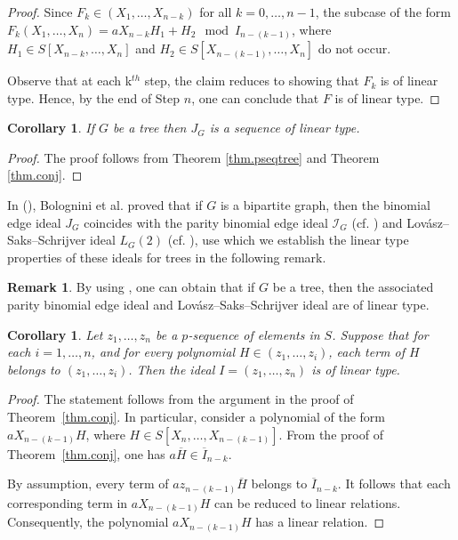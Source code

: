 \documentclass[11pt,a4paper,reqno]{amsart}
\newtheorem{corollary}[theorem]{Corollary}
\theoremstyle{definition}
\newtheorem{remark}[theorem]{Remark}
\begin{document}
\begin{proof}
    \vspace{2mm}

    Since \(F_k \in (X_1,\ldots,X_{n-k})\) for all \(k=0,\ldots,n-1\), the subcase of the form $F_{k}(X_1,\ldots, X_n) = aX_{n-k}H_1 + H_2 \mod I_{n-(k-1)}$, where $H_1 \in S[X_{n-k},\ldots, X_n]$ and $H_2 \in S[X_{n-(k-1)},\ldots, X_n]$ do not occur.
    

    Observe that at each k$^{th}$ step, the claim  reduces to showing that $F_{k}$ is of linear type. Hence, by the end of Step $n$, one can conclude that $F$ is of linear type. 
\end{proof}






\begin{corollary}
     If $G$ be a tree then $J_G$ is a sequence of linear type.
\end{corollary}
\begin{proof}
    The proof follows from Theorem \ref{thm.pseqtree} and Theorem \ref{thm.conj}.
\end{proof}

In (\cite[Corollary 6.2]{B2018}), Bolognini et al. proved that if $G$ is a bipartite graph, then the binomial edge ideal $J_G$ coincides with the parity binomial edge ideal $\mathcal{I}_G$ (cf. \cite{TCT}) and Lovász–Saks–Schrijver ideal $L_G(2)$ (cf. \cite{HMSW}), use which we establish the linear type properties of these ideals for trees in the following remark.

\begin{remark}
    By using \cite[Corollary 6.2]{B2018}, one can obtain that if $G$ be a tree, then the associated parity binomial edge ideal and Lovász–Saks–Schrijver ideal are of linear type. 
\end{remark}



\begin{corollary}
Let \(z_1,\ldots,z_n\) be a \(p\)-sequence of elements in \(S\). Suppose that for each \(i=1,\ldots,n\), and for every polynomial \(H \in (z_1,\ldots,z_i)\), each term of \(H\) belongs to \((z_1,\ldots,z_i)\). Then the ideal \(I=(z_1,\ldots,z_n)\) is of linear type.
\end{corollary}
\begin{proof}
The statement follows from the argument in the proof of Theorem~\ref{thm.conj}. In particular, consider a polynomial of the form \(aX_{n-(k-1)}H\), where \(H \in S[X_n,\ldots,X_{n-(k-1)}]\). From the proof of Theorem~\ref{thm.conj}, one has $a\overline{H} \in \overline{I}_{n-k}$.

By assumption, every term of \(az_{n-(k-1)}\overline{H}\) belongs to \(\overline{I}_{n-k}\). It follows that each corresponding term in \(aX_{n-(k-1)}H\) can be reduced to linear relations. Consequently, the polynomial \(aX_{n-(k-1)}H\) has a linear relation.
\end{proof}
\end{document}
